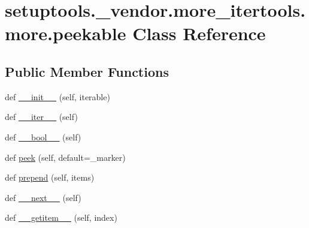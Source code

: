 \hypertarget{classsetuptools_1_1__vendor_1_1more__itertools_1_1more_1_1peekable}{}\section{setuptools.\+\_\+vendor.\+more\+\_\+itertools.\+more.\+peekable Class Reference}
\label{classsetuptools_1_1__vendor_1_1more__itertools_1_1more_1_1peekable}
\subsection*{Public Member Functions}
\begin{DoxyCompactItemize}
\item 
def \hyperlink{classsetuptools_1_1__vendor_1_1more__itertools_1_1more_1_1peekable_a266d9ceb455a2762664b49d0a4dd6497}{\+\_\+\+\_\+init\+\_\+\+\_\+} (self, iterable)
\item 
def \hyperlink{classsetuptools_1_1__vendor_1_1more__itertools_1_1more_1_1peekable_a036610b06e3a9235db4f9b073462deb5}{\+\_\+\+\_\+iter\+\_\+\+\_\+} (self)
\item 
def \hyperlink{classsetuptools_1_1__vendor_1_1more__itertools_1_1more_1_1peekable_af7e592856e4d088bcdb0894d0a9f500b}{\+\_\+\+\_\+bool\+\_\+\+\_\+} (self)
\item 
def \hyperlink{classsetuptools_1_1__vendor_1_1more__itertools_1_1more_1_1peekable_aa43a1b52c4f8dc9527b3eaa23f66582f}{peek} (self, default=\+\_\+marker)
\item 
def \hyperlink{classsetuptools_1_1__vendor_1_1more__itertools_1_1more_1_1peekable_ab6bdf003955fee893e47e15f0bb85a5a}{prepend} (self, items)
\item 
def \hyperlink{classsetuptools_1_1__vendor_1_1more__itertools_1_1more_1_1peekable_adb9a31f31c2d4aede835abf091887192}{\+\_\+\+\_\+next\+\_\+\+\_\+} (self)
\item 
def \hyperlink{classsetuptools_1_1__vendor_1_1more__itertools_1_1more_1_1peekable_ad3f156a7d03b9ec9d79760dbc2fd91d4}{\+\_\+\+\_\+getitem\+\_\+\+\_\+} (self, index)
\end{DoxyCompactItemize}


